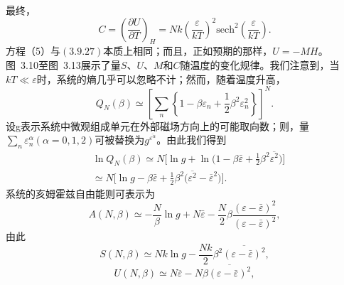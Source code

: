 最终，
\begin{equation}\tag{3.5.110}\label{eq:3.5.110}
C = \left( \frac { \partial U } { \partial T } \right) _ { H } = N k \left( \frac { \varepsilon } { k T } \right) ^{2} \mathrm { s e c h } ^{2} \left( \frac { \varepsilon } { k T } \right) .
\end{equation}
方程（5）与\((3.9.27)\)本质上相同；而且，正如预期的那样，\(U = -MH\)。
图~3.10至图~3.13展示了量\(S\)、\(U\)、\(M\)和\(C\)随温度的变化规律。我们注意到，当\(kT \ll \varepsilon\)时，系统的熵几乎可以忽略不计；然而，随着温度升高，
\begin{equation}\tag{3.5.111}\label{eq:3.5.111}
Q _ { N } ( \beta ) \simeq \left[ \sum _ { n } \left\{ 1 - \beta \varepsilon _ { n } + \frac { 1 } { 2 } \beta ^{2} \varepsilon _ { n } ^{2} \right\} \right] ^{N} .
\end{equation}
设g表示系统中微观组成单元在外部磁场方向上的可能取向数；则，量\(\sum_{n} \varepsilon_{n}^{\alpha}(\alpha=0,1,2)\)可被替换为\(g^{\overline{\varepsilon^{\alpha}}}\)。由此我们得到
\begin{equation}\tag{3.5.112}\label{eq:3.5.112}
\begin{array}{rl} & { \ln Q _ { N } ( \beta ) \simeq N \Big [ \ln g + \ln \Big ( 1 - \beta \bar { \varepsilon } + \frac { 1 } { 2 } \beta ^{2} \overline { { \varepsilon ^{2} } } \Big ) \Big ] } \\& {  \simeq N \Big [ \ln g - \beta \bar { \varepsilon } + \frac { 1 } { 2 } \beta ^{2} \Big ( \overline { { \varepsilon ^{2} } } - \overline { { \varepsilon } } ^{2} \Big ) \Big ] . } \end{array}
\end{equation}
系统的亥姆霍兹自由能则可表示为
\begin{equation}\tag{3.5.113}\label{eq:3.5.113}
A ( N , \beta ) \simeq - \frac { N } { \beta } \ln g + N \bar { \varepsilon } - \frac { N } { 2 } \beta \frac { ( \varepsilon - \bar { \varepsilon } ) ^{2} } { ( \varepsilon - \bar { \varepsilon } ) ^{2} } ,
\end{equation}
由此
\begin{equation}\tag{3.5.114}\label{eq:3.5.114}
S ( N , \beta ) \simeq N k \ln g - \frac { N k } { 2 } \beta ^{2} \overline { { ( \varepsilon - \bar { \varepsilon } ) ^{2} } } ,
\end{equation}
\begin{equation}\tag{3.5.115}\label{eq:3.5.115}
U ( N , \beta ) \simeq N \overline { { \varepsilon } } - N \beta \overline { { ( \varepsilon - \bar { \varepsilon } ) ^{2} } } ,
\end{equation}
